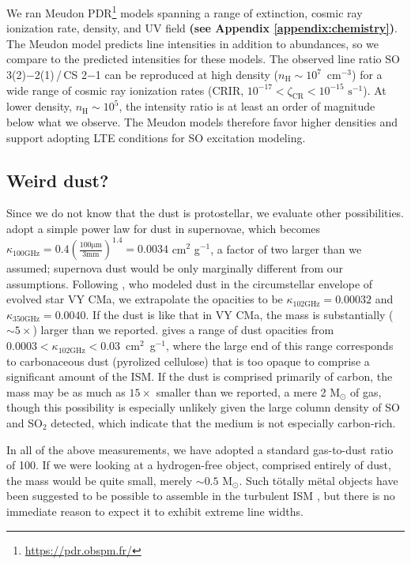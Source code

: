 \documentclass[]{aastex631}
\newcommand{\msun}{\ensuremath{\mathrm{M}_\odot}\xspace}
\newcommand{\um}{\ensuremath{\mathrm{\mu m}}\xspace}
\newcommand{\percc}{\ensuremath{\mathrm{cm}^{-3}}\xspace}
\newcommand{\pers}{\ensuremath{\mathrm{s}^{-1}}\xspace}
\def\rr#1{\textbf{#1}}
\begin{document}
We ran Meudon PDR\footnote{\url{https://pdr.obspm.fr/}} \citep{LePetit2006} models spanning a range of extinction, cosmic ray ionization rate, density, and UV field \rr{(see Appendix \ref{appendix:chemistry})}.
The Meudon model predicts line intensities in addition to abundances, so we compare to the predicted intensities for these models.
The observed line ratio SO 3(2)$-$2(1)\,/\,CS 2$-$1 can be reproduced at high density ($n_\mathrm{H}\sim10^7$~\percc) for a wide range of cosmic ray ionization rates (CRIR, $10^{-17} < \zeta_\mathrm{CR} < 10^{-15}$ \pers). 
At lower density, $n_\mathrm{H}\sim10^5$, the intensity ratio is at least an order of magnitude below what we observe.
The Meudon models therefore favor higher densities and support adopting LTE conditions for SO excitation modeling.

\subsection{Weird dust?}
\label{sec:weirddust}

Since we do not know that the dust is protostellar, we evaluate other possibilities.  
\citet{Bianchi2007} adopt a simple power law for dust in supernovae, which becomes $\kappa_\mathrm{100 GHz}=0.4\left(\frac{100\um}{3 \mathrm{mm}}\right)^{1.4}=0.0034$ cm$^2$ g$^{-1}$, a factor of two larger than we assumed; supernova dust would be only marginally different from our assumptions.
Following \citet{Kaminski2019}, who modeled dust in the circumstellar envelope of evolved star VY CMa, we extrapolate the \citet{Draine1984} opacities to be $\kappa_\mathrm{102 GHz}=0.00032$ and $\kappa_\mathrm{350 GHz}=0.0040$.
If the dust is like that in VY CMa, the mass is substantially ($\sim5\times$) larger than we reported.
\citet{Draine2006} gives a range of dust opacities from $0.0003<\kappa_\mathrm{102 GHz} < 0.03$~cm$^2$~g$^{-1}$, where the large end of this range corresponds to carbonaceous dust (pyrolized cellulose) that is too opaque to comprise a significant amount of the ISM.
If the dust is comprised primarily of carbon, the mass may be as much as $15\times$ smaller than we reported, a mere 2 \msun of gas, though this possibility is especially unlikely given the large column density of SO and SO$_2$ detected, which indicate that the medium is not especially carbon-rich.

In all of the above measurements, we have adopted a standard gas-to-dust ratio of 100.
If we were looking at a hydrogen-free object, comprised entirely of dust, the mass would be quite small, merely $\sim0.5$ \msun.
Such t{\"o}tally m{\"e}tal objects have been suggested to be possible to assemble in the turbulent ISM \citep{Hopkins2014}, but there is no immediate reason to expect it to exhibit extreme line widths.
\end{document}
